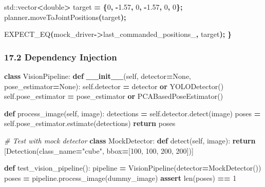 \documentclass[
]{article}
\newenvironment{Shaded}{\begin{snugshade}}{\end{snugshade}}
\newcommand{\BuiltInTok}[1]{#1}
\newcommand{\CommentTok}[1]{\textcolor[rgb]{0.56,0.35,0.01}{\textit{#1}}}
\newcommand{\ControlFlowTok}[1]{\textcolor[rgb]{0.13,0.29,0.53}{\textbf{#1}}}
\newcommand{\DataTypeTok}[1]{\textcolor[rgb]{0.13,0.29,0.53}{#1}}
\newcommand{\DecValTok}[1]{\textcolor[rgb]{0.00,0.00,0.81}{#1}}
\newcommand{\FloatTok}[1]{\textcolor[rgb]{0.00,0.00,0.81}{#1}}
\newcommand{\FunctionTok}[1]{\textcolor[rgb]{0.13,0.29,0.53}{\textbf{#1}}}
\newcommand{\KeywordTok}[1]{\textcolor[rgb]{0.13,0.29,0.53}{\textbf{#1}}}
\newcommand{\NormalTok}[1]{#1}
\newcommand{\OperatorTok}[1]{\textcolor[rgb]{0.81,0.36,0.00}{\textbf{#1}}}
\newcommand{\StringTok}[1]{\textcolor[rgb]{0.31,0.60,0.02}{#1}}
\newcommand{\VariableTok}[1]{\textcolor[rgb]{0.00,0.00,0.00}{#1}}
\begin{document}
\begin{Shaded}
\begin{Highlighting}[]
    \BuiltInTok{std::}\NormalTok{vector}\OperatorTok{\textless{}}\DataTypeTok{double}\OperatorTok{\textgreater{}}\NormalTok{ target }\OperatorTok{=} \OperatorTok{\{}\DecValTok{0}\OperatorTok{,} \OperatorTok{{-}}\FloatTok{1.57}\OperatorTok{,} \DecValTok{0}\OperatorTok{,} \OperatorTok{{-}}\FloatTok{1.57}\OperatorTok{,} \DecValTok{0}\OperatorTok{,} \DecValTok{0}\OperatorTok{\};}
\NormalTok{    planner}\OperatorTok{.}\NormalTok{moveToJointPositions}\OperatorTok{(}\NormalTok{target}\OperatorTok{);}

\NormalTok{    EXPECT\_EQ}\OperatorTok{(}\NormalTok{mock\_driver}\OperatorTok{{-}\textgreater{}}\VariableTok{last\_commanded\_positions\_}\OperatorTok{,}\NormalTok{ target}\OperatorTok{);}
\OperatorTok{\}}
\end{Highlighting}
\end{Shaded}

\hypertarget{dependency-injection}{%
\subsubsection{17.2 Dependency Injection}\label{dependency-injection}}

\begin{Shaded}
\begin{Highlighting}[]
\KeywordTok{class}\NormalTok{ VisionPipeline:}
    \KeywordTok{def} \FunctionTok{\_\_init\_\_}\NormalTok{(}\VariableTok{self}\NormalTok{, detector}\OperatorTok{=}\VariableTok{None}\NormalTok{, pose\_estimator}\OperatorTok{=}\VariableTok{None}\NormalTok{):}
        \VariableTok{self}\NormalTok{.detector }\OperatorTok{=}\NormalTok{ detector }\KeywordTok{or}\NormalTok{ YOLODetector()}
        \VariableTok{self}\NormalTok{.pose\_estimator }\OperatorTok{=}\NormalTok{ pose\_estimator }\KeywordTok{or}\NormalTok{ PCABasedPoseEstimator()}

    \KeywordTok{def}\NormalTok{ process\_image(}\VariableTok{self}\NormalTok{, image):}
\NormalTok{        detections }\OperatorTok{=} \VariableTok{self}\NormalTok{.detector.detect(image)}
\NormalTok{        poses }\OperatorTok{=} \VariableTok{self}\NormalTok{.pose\_estimator.estimate(detections)}
        \ControlFlowTok{return}\NormalTok{ poses}

\CommentTok{\# Test with mock detector}
\KeywordTok{class}\NormalTok{ MockDetector:}
    \KeywordTok{def}\NormalTok{ detect(}\VariableTok{self}\NormalTok{, image):}
        \ControlFlowTok{return}\NormalTok{ [Detection(class\_name}\OperatorTok{=}\StringTok{"cube"}\NormalTok{, bbox}\OperatorTok{=}\NormalTok{[}\DecValTok{100}\NormalTok{, }\DecValTok{100}\NormalTok{, }\DecValTok{200}\NormalTok{, }\DecValTok{200}\NormalTok{])]}

\KeywordTok{def}\NormalTok{ test\_vision\_pipeline():}
\NormalTok{    pipeline }\OperatorTok{=}\NormalTok{ VisionPipeline(detector}\OperatorTok{=}\NormalTok{MockDetector())}
\NormalTok{    poses }\OperatorTok{=}\NormalTok{ pipeline.process\_image(dummy\_image)}
    \ControlFlowTok{assert} \BuiltInTok{len}\NormalTok{(poses) }\OperatorTok{==} \DecValTok{1}
\end{Highlighting}
\end{Shaded}
\end{document}
